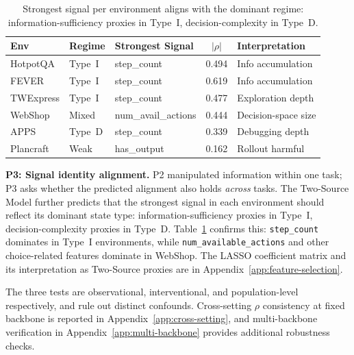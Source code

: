 \begin{table}
\vspace{-12pt}
\caption{Strongest signal per environment aligns with the
dominant regime: information-sufficiency proxies in Type~I,
decision-complexity in Type~D.}
\vspace{-0.05in}
\label{tab:signal-identity}
\centering\footnotesize
\setlength{\tabcolsep}{3pt}
\begin{tabular}{lllcl}
\toprule
\textbf{Env} & \textbf{Regime} & \textbf{Strongest Signal} & $|\rho|$ & \textbf{Interpretation} \\
\midrule
HotpotQA   & Type~I & step\_count        & 0.494 & Info accumulation \\
FEVER      & Type~I & step\_count        & 0.619 & Info accumulation \\
TWExpress  & Type~I & step\_count        & 0.477 & Exploration depth \\
WebShop    & Mixed  & num\_avail\_actions & 0.444 & Decision-space size \\
APPS       & Type~D & step\_count        & 0.339 & Debugging depth \\
Plancraft  & Weak   & has\_output        & 0.162 & Rollout harmful \\
\bottomrule
\end{tabular}
\vspace{-10pt}
\end{table}
\textbf{P3: Signal identity alignment.}
P2 manipulated information within one task; P3 asks whether the
predicted alignment also holds \emph{across} tasks. The
Two-Source Model further predicts that the strongest signal in
each environment should reflect its dominant state type:
information-sufficiency proxies in Type~I, decision-complexity
proxies in Type~D. Table~\ref{tab:signal-identity} confirms this: \texttt{step\_count} dominates in Type~I environments,
while \texttt{num\_available\_actions} and other choice-related features dominate in WebShop. The LASSO coefficient matrix and its interpretation as Two-Source proxies are in Appendix~\ref{app:feature-selection}.

The three tests are observational, interventional, and
population-level respectively, and rule out distinct confounds.
Cross-setting $\rho$ consistency at fixed backbone is reported
in Appendix~\ref{app:cross-setting}, and multi-backbone
verification in Appendix~\ref{app:multi-backbone} provides
additional robustness checks.



